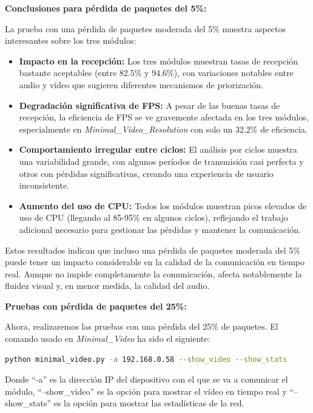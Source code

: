 \textbf{Conclusiones para pérdida de paquetes del 5\%:}

La prueba con una pérdida de paquetes moderada del 5\% muestra aspectos interesantes sobre los tres módulos:

\begin{itemize}
    \item \textbf{Impacto en la recepción:} Los tres módulos muestran tasas de recepción bastante aceptables (entre 82.5\% y 94.6\%), con variaciones notables entre audio y vídeo que sugieren diferentes mecanismos de priorización.
    
    \item \textbf{Degradación significativa de FPS:} A pesar de las buenas tasas de recepción, la eficiencia de FPS se ve gravemente afectada en los tres módulos, especialmente en \textit{Minimal\_Video\_Resolution} con solo un 32.2\% de eficiencia.
    
    \item \textbf{Comportamiento irregular entre ciclos:} El análisis por ciclos muestra una variabilidad grande, con algunos períodos de transmisión casi perfecta y otros con pérdidas significativas, creando una experiencia de usuario inconsistente.
    
    \item \textbf{Aumento del uso de CPU:} Todos los módulos muestran picos elevados de uso de CPU (llegando al 85-95\% en algunos ciclos), reflejando el trabajo adicional necesario para gestionar las pérdidas y mantener la comunicación.
\end{itemize}

Estos resultados indican que incluso una pérdida de paquetes moderada del 5\% puede tener un impacto considerable en la calidad de la comunicación en tiempo real. Aunque no impide completamente la comunicación, afecta notablemente la fluidez visual y, en menor medida, la calidad del audio.

\newpage

\textbf{Pruebas con pérdida de paquetes del 25\%:}
\vspace{\baselineskip}

Ahora, realizaremos las pruebas con una pérdida del 25\% de paquetes. El comando usado en \textit{Minimal\_Video} ha sido el siguiente:

\begin{lstlisting}[language=bash]
python minimal_video.py -a 192.168.0.58 --show_video --show_stats
\end{lstlisting}
Donde ``-a'' es la dirección IP del dispositivo con el que se va a comunicar el módulo, ``--show\_video'' es la opción para mostrar el vídeo en tiempo real y ``--show\_stats'' es la opción para mostrar las estadísticas de la red.
\vspace{\baselineskip}

